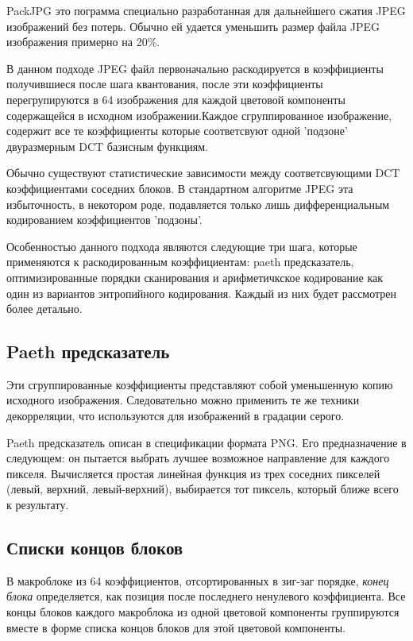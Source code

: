 \documentclass{matmex-diploma-custom}
\begin{document}
PackJPG это пограмма специально разработанная для дальнейшего сжатия JPEG изображений без потерь. Обычно ей удается уменьшить размер файла JPEG изображения  примерно на 20\%.

В данном подходе JPEG файл первоначально раскодируется в коэффициенты получившиеся после шага квантования,
после эти коэффициенты перегрупируются в 64 изображения для каждой цветовой компоненты содержащейся в исходном изображении.Каждое сгруппированное изображение, содержит все те коэффициенты которые соответсвуют одной 'подзоне' двуразмерным DCT базисным функциям.

Обычно существуют статистические зависимости между соответсвующими DCT коэффициентами соседних блоков. В стандартном алгоритме JPEG эта избыточность, в некотором роде, подавляется только лишь дифференциальным кодированием коэффициентов 'подзоны'.

Особенностью данного подхода являются следующие три шага, которые применяются к раскодированным коэффициентам:
paeth предсказатель, оптимизированные порядки сканирования и арифметичкское кодирование как один из вариантов энтропийного кодирования. Каждый из них будет рассмотрен более детально.

\subsection{Paeth предсказатель}
Эти сгруппированные коэффициенты представляют собой уменьшенную копию исходного изображения. Следовательно можно применить те же техники декорреляции, что используются для изображений в градации серого.

Paeth предсказатель описан в спецификации формата PNG. Его предназначение в следующем: он пытается выбрать лучшее возможное направление для каждого пикселя. Вычисляется простая линейная функция из трех соседних пикселей (левый, верхний, левый-верхний), выбирается тот пиксель, который ближе всего к результату.
\subsection{Списки концов блоков}
В макроблоке из 64 коэффициентов, отсортированных в зиг-заг порядке, \emph{конец блока} определяется, как позиция после последнего ненулевого коэффициента. Все концы блоков каждого макроблока из одной цветовой компоненты группируются вместе в форме списка концов блоков для этой цветовой компоненты.
\end{document}

